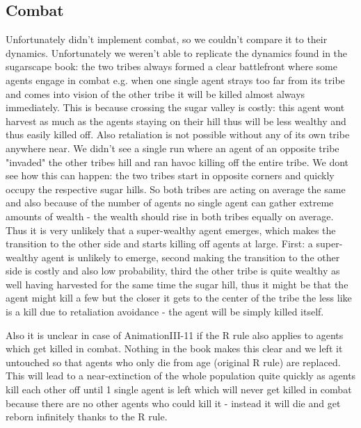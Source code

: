 \subsection{Combat}
Unfortunately \cite{weaver_replicating_nodate} didn't implement combat, so we couldn't compare it to their dynamics. Unfortunately we weren't able to replicate the dynamics found in the sugarscape book: the two tribes always formed a clear battlefront where some agents engage in combat e.g. when one single agent strays too far from its tribe and comes into vision of the other tribe it will be killed almost always immediately. This is because crossing the sugar valley is costly: this agent wont harvest as much as the agents staying on their hill thus will be less wealthy and thus easily killed off. Also retaliation is not possible without any of its own tribe anywhere near. 
We didn't see a single run where an agent of an opposite tribe "invaded" the other tribes hill and ran havoc killing off the entire tribe. We dont see how this can happen: the two tribes start in opposite corners and quickly occupy the respective sugar hills. So both tribes are acting on average the same and also because of the number of agents no single agent can gather extreme amounts of wealth - the wealth should rise in both tribes equally on average. Thus it is very unlikely that a super-wealthy agent emerges, which makes the transition to the other side and starts killing off agents at large. First: a super-wealthy agent is unlikely to emerge, second making the transition to the other side is costly and also low probability, third the other tribe is quite wealthy as well having harvested for the same time the sugar hill, thus it might be that the agent might kill a few but the closer it gets to the center of the tribe the less like is a kill due to retaliation avoidance - the agent will be simply killed itself.

Also it is unclear in case of AnimationIII-11 if the R rule also applies to agents which get killed in combat. Nothing in the book makes this clear and we left it untouched so that agents who only die from age (original R rule) are replaced. This will lead to a near-extinction of the whole population quite quickly as agents kill each other off until 1 single agent is left which will never get killed in combat because there are no other agents who could kill it - instead it will die and get reborn infinitely thanks to the R rule.


